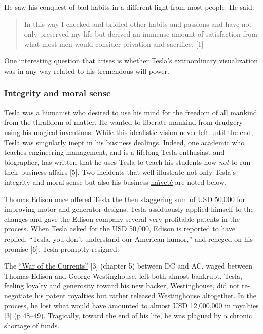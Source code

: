 \documentclass[
  12pt,
  british,
  a4paper,
]{article}
\begin{document}
He saw his conquest of bad habits in a different light from most people.
He said:

\begin{quote}
In this way I checked and bridled other habits and passions and have not
only preserved my life but derived an immense amount of satisfaction
from what most men would consider privation and sacrifice. {[}1{]}
\end{quote}

One interesting question that arises is whether Tesla's extraordinary
visualization was in any way related to his tremendous will power.

\hypertarget{integrity-and-moral-sense}{%
\subsubsection{Integrity and moral
sense}\label{integrity-and-moral-sense}}

Tesla was a humanist who desired to use his mind for the freedom of all
mankind from the thralldom of matter. He wanted to liberate mankind from
drudgery using his magical inventions. While this idealistic vision
never left until the end, Tesla was singularly inept in his business
dealings. Indeed, one academic who teaches engineering management, and
is a lifelong Tesla enthusiast and biographer, has written that he uses
Tesla to teach his students how \emph{not} to run their business affairs
{[}5{]}. Two incidents that well illustrate not only Tesla's integrity
and moral sense but also his business
\href{https://www.thefreedictionary.com/naivete}{naïveté} are noted
below.

Thomas Edison once offered Tesla the then staggering sum of USD 50,000
for improving motor and generator designs. Tesla assiduously applied
himself to the changes and gave the Edison company several very
profitable patents in the process. When Tesla asked for the USD 50,000,
Edison is reported to have replied, ``Tesla, you don't understand our
American humor,'' and reneged on his promise {[}6{]}. Tesla promptly
resigned.

The \href{https://en.wikipedia.org/wiki/War_of_the_currents}{``War of
the Currents''} {[}3{]} (chapter 5) between DC and AC, waged between
Thomas Edison and George Westinghouse, left both almost bankrupt. Tesla,
feeling loyalty and generosity toward his new backer, Westinghouse, did
not re-negotiate his patent royalties but rather released Westinghouse
altogether. In the process, he lost what would have amounted to almost
USD 12,000,000 in royalties {[}3{]} (p 48--49). Tragically, toward the
end of his life, he was plagued by a chronic shortage of funds.
\end{document}
